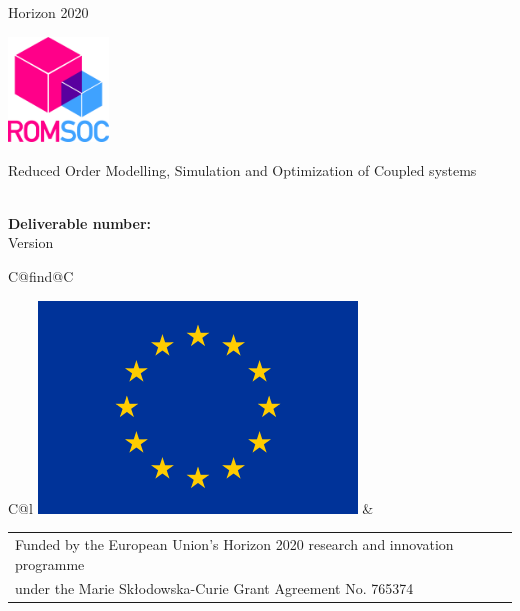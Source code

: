 \documentclass{ROMSOC}
\begin{document}
\begin{center}
Horizon 2020
\vspace{2cm}

  \begin{center}
  \includegraphics[width=0.2\textwidth]{./images/ROMSOC_Logo}
  \vspace{2mm}
  \end{center}
  \vspace{1cm}
  {\Large Reduced Order Modelling, Simulation and Optimization of Coupled systems}
  \vspace{2cm}

  \begin{spacing}{2.5}
    \textbf{\Huge \DelTitle}\\\vspace{10mm}
    \textbf{\Large Deliverable number: \DelNumber} \\\vspace{10mm} 
    {\large Version \DelVersion}
  \end{spacing}
  
  \vspace*{\fill}

  \newcommand\undefcolumntype[1]{\expandafter\let\csname NC@find@#1\endcsname\relax}
  \newcommand\forcenewcolumntype[1]{\undefcolumntype{#1}\newcolumntype{#1}}
  \forcenewcolumntype{C}{ >{\arraybackslash} m{3cm} }

  \begin{tabular}{C@{\hspace*{0cm}}l}
    \includegraphics[scale=0.2]{./images/logos/EU_Flag} &
    \begin{tabular}{l}
    {Funded by the European Union’s Horizon 2020 research and innovation programme}\\
    {under the Marie Sk\l odowska-Curie Grant Agreement No. 765374}\\
    \end{tabular}
  \end{tabular}
\end{center}
\end{document}
